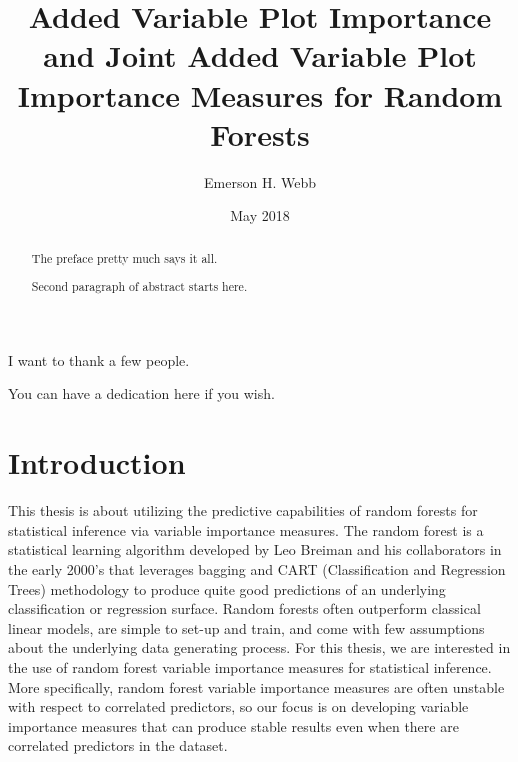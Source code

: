 \documentclass[12pt,twoside]{reedthesis}
\title{Added Variable Plot Importance and Joint Added Variable Plot Importance
Measures for Random Forests}
\author{Emerson H. Webb}
\date{May 2018}
\theoremstyle{definition}
\theoremstyle{definition}
\theoremstyle{definition}
\theoremstyle{remark}
\begin{document}
  \maketitle

\frontmatter %
\pagestyle{empty} %
  \begin{acknowledgements}
    I want to thank a few people.
  \end{acknowledgements}

  \hypersetup{linkcolor=black}
  \setcounter{tocdepth}{2}
  \tableofcontents

  \listoftables

  \listoffigures
  \begin{abstract}
    The preface pretty much says it all. \par
    
    Second paragraph of abstract starts here.
  \end{abstract}
  \begin{dedication}
    You can have a dedication here if you wish.
  \end{dedication}
\mainmatter %
\pagestyle{fancyplain} %

\chapter*{Introduction}\label{introduction}

This thesis is about utilizing the predictive capabilities of random
forests for statistical inference via variable importance measures. The
random forest is a statistical learning algorithm developed by Leo
Breiman and his collaborators in the early 2000's that leverages bagging
and CART (Classification and Regression Trees) methodology to produce
quite good predictions of an underlying classification or regression
surface. Random forests often outperform classical linear models, are
simple to set-up and train, and come with few assumptions about the
underlying data generating process. For this thesis, we are interested
in the use of random forest variable importance measures for statistical
inference. More specifically, random forest variable importance measures
are often unstable with respect to correlated predictors, so our focus
is on developing variable importance measures that can produce stable
results even when there are correlated predictors in the dataset. \par
\end{document}
